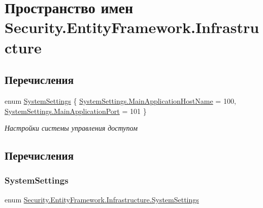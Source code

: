 \hypertarget{namespace_security_1_1_entity_framework_1_1_infrastructure}{}\section{Пространство имен Security.\+Entity\+Framework.\+Infrastructure}
\label{namespace_security_1_1_entity_framework_1_1_infrastructure}
\subsection*{Перечисления}
\begin{DoxyCompactItemize}
\item 
enum \hyperlink{namespace_security_1_1_entity_framework_1_1_infrastructure_a74d37700d96341011c67c8f8ccd83cfe}{System\+Settings} \{ \hyperlink{namespace_security_1_1_entity_framework_1_1_infrastructure_a74d37700d96341011c67c8f8ccd83cfeabe0572941930df493f6bd660b93bd4a0}{System\+Settings.\+Main\+Application\+Host\+Name} = 100, 
\hyperlink{namespace_security_1_1_entity_framework_1_1_infrastructure_a74d37700d96341011c67c8f8ccd83cfea0fd31a2bccdbc00e9cb3013cab3be606}{System\+Settings.\+Main\+Application\+Port} = 101
 \}\begin{DoxyCompactList}\small\item\em Настройки системы управления доступом \end{DoxyCompactList}
\end{DoxyCompactItemize}


\subsection{Перечисления}
\mbox{\label{namespace_security_1_1_entity_framework_1_1_infrastructure_a74d37700d96341011c67c8f8ccd83cfe}} 
\subsubsection{\texorpdfstring{System\+Settings}{SystemSettings}}
{\footnotesize\ttfamily enum \hyperlink{namespace_security_1_1_entity_framework_1_1_infrastructure_a74d37700d96341011c67c8f8ccd83cfe}{Security.\+Entity\+Framework.\+Infrastructure.\+System\+Settings}\hspace{0.3cm}{\ttfamily [strong]}}



